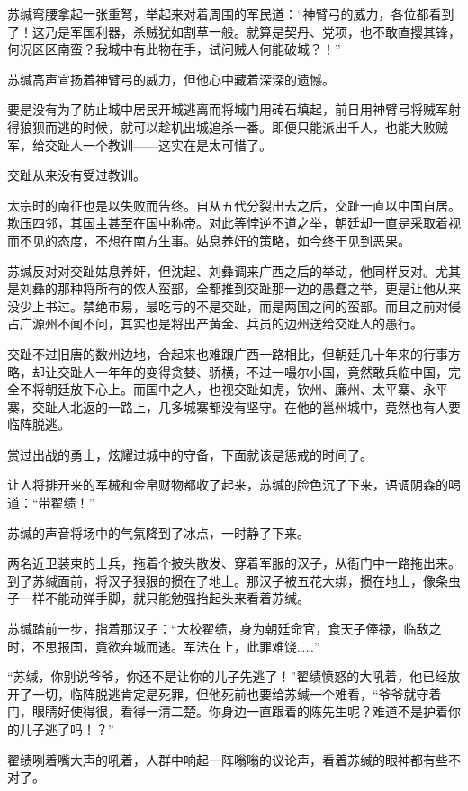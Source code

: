 苏缄弯腰拿起一张重弩，举起来对着周围的军民道：“神臂弓的威力，各位都看到了！这乃是军国利器，杀贼犹如割草一般。就算是契丹、党项，也不敢直撄其锋，何况区区南蛮？我城中有此物在手，试问贼人何能破城？！”

苏缄高声宣扬着神臂弓的威力，但他心中藏着深深的遗憾。

要是没有为了防止城中居民开城逃离而将城门用砖石填起，前日用神臂弓将贼军射得狼狈而逃的时候，就可以趁机出城追杀一番。即便只能派出千人，也能大败贼军，给交趾人一个教训——这实在是太可惜了。

交趾从来没有受过教训。

太宗时的南征也是以失败而告终。自从五代分裂出去之后，交趾一直以中国自居。欺压四邻，其国主甚至在国中称帝。对此等悖逆不道之举，朝廷却一直是采取着视而不见的态度，不想在南方生事。姑息养奸的策略，如今终于见到恶果。

苏缄反对对交趾姑息养奸，但沈起、刘彝调来广西之后的举动，他同样反对。尤其是刘彝的那种将所有的侬人蛮部，全都推到交趾那一边的愚蠢之举，更是让他从来没少上书过。禁绝市易，最吃亏的不是交趾，而是两国之间的蛮部。而且之前对侵占广源州不闻不问，其实也是将出产黄金、兵员的边州送给交趾人的愚行。

交趾不过旧唐的数州边地，合起来也难跟广西一路相比，但朝廷几十年来的行事方略，却让交趾人一年年的变得贪婪、骄横，不过一嘬尔小国，竟然敢兵临中国，完全不将朝廷放下心上。而国中之人，也视交趾如虎，钦州、廉州、太平寨、永平寨，交趾人北返的一路上，几多城寨都没有坚守。在他的邕州城中，竟然也有人要临阵脱逃。

赏过出战的勇士，炫耀过城中的守备，下面就该是惩戒的时间了。

让人将排开来的军械和金帛财物都收了起来，苏缄的脸色沉了下来，语调阴森的喝道：“带翟绩！”

苏缄的声音将场中的气氛降到了冰点，一时静了下来。

两名近卫装束的士兵，拖着个披头散发、穿着军服的汉子，从衙门中一路拖出来。到了苏缄面前，将汉子狠狠的掼在了地上。那汉子被五花大绑，掼在地上，像条虫子一样不能动弹手脚，就只能勉强抬起头来看着苏缄。

苏缄踏前一步，指着那汉子：“大校翟绩，身为朝廷命官，食天子俸禄，临敌之时，不思报国，竟欲弃城而逃。军法在上，此罪难饶……”

“苏缄，你别说爷爷，你还不是让你的儿子先逃了！”翟绩愤怒的大吼着，他已经放开了一切，临阵脱逃肯定是死罪，但他死前也要给苏缄一个难看，“爷爷就守着门，眼睛好使得很，看得一清二楚。你身边一直跟着的陈先生呢？难道不是护着你的儿子逃了吗！？”

翟绩咧着嘴大声的吼着，人群中响起一阵嗡嗡的议论声，看着苏缄的眼神都有些不对了。

